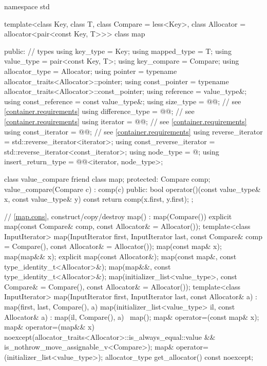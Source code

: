 %
%
\begin{codeblock}
namespace std {
  template<class Key, class T, class Compare = less<Key>,
           class Allocator = allocator<pair<const Key, T>>>
  class map {
  public:
    // types
    using key_type               = Key;
    using mapped_type            = T;
    using value_type             = pair<const Key, T>;
    using key_compare            = Compare;
    using allocator_type         = Allocator;
    using pointer                = typename allocator_traits<Allocator>::pointer;
    using const_pointer          = typename allocator_traits<Allocator>::const_pointer;
    using reference              = value_type&;
    using const_reference        = const value_type&;
    using size_type              = @@; // see \ref{container.requirements}
    using difference_type        = @@; // see \ref{container.requirements}
    using iterator               = @@; // see \ref{container.requirements}
    using const_iterator         = @@; // see \ref{container.requirements}
    using reverse_iterator       = std::reverse_iterator<iterator>;
    using const_reverse_iterator = std::reverse_iterator<const_iterator>;
    using node_type              = @\unspec@;
    using insert_return_type     = @@<iterator, node_type>;

    class value_compare {
      friend class map;
    protected:
      Compare comp;
      value_compare(Compare c) : comp(c) {}
    public:
      bool operator()(const value_type& x, const value_type& y) const {
        return comp(x.first, y.first);
      }
    };

    // \ref{map.cons}, construct/copy/destroy
    map() : map(Compare()) { }
    explicit map(const Compare& comp, const Allocator& = Allocator());
    template<class InputIterator>
      map(InputIterator first, InputIterator last,
          const Compare& comp = Compare(), const Allocator& = Allocator());
    map(const map& x);
    map(map&& x);
    explicit map(const Allocator&);
    map(const map&, const type_identity_t<Allocator>&);
    map(map&&, const type_identity_t<Allocator>&);
    map(initializer_list<value_type>,
      const Compare& = Compare(),
      const Allocator& = Allocator());
    template<class InputIterator>
      map(InputIterator first, InputIterator last, const Allocator& a)
        : map(first, last, Compare(), a) { }
    map(initializer_list<value_type> il, const Allocator& a)
      : map(il, Compare(), a) { }
    ~map();
    map& operator=(const map& x);
    map& operator=(map&& x)
      noexcept(allocator_traits<Allocator>::is_always_equal::value &&
               is_nothrow_move_assignable_v<Compare>);
    map& operator=(initializer_list<value_type>);
    allocator_type get_allocator() const noexcept;

}}
\end{codeblock}
